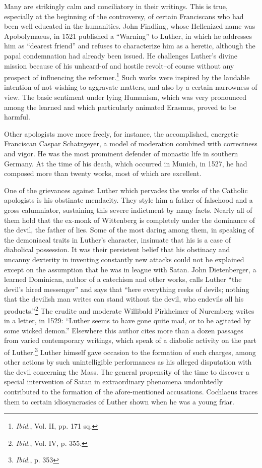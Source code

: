 Many are strikingly calm and conciliatory in their writings. This is
true, especially at the beginning of the controversy, of certain Franciscans
who had been well educated in the humanities. John Findling,
whose Hellenized name was Apobolymaeus, in 1521 published a
“Warning” to Luther, in which he addresses him as “dearest friend”
and refuses to characterize him as a heretic, although the papal condemnation
had already been issued. He challenges Luther’s divine
mission because of his unheard-of and hostile revolt--of course without
any prospect of influencing the reformer.\footnote{\textit{Ibid.}, Vol. II, pp. 171 sq.}
Such works were inspired
by the laudable intention of not wishing to aggravate matters,
and also by a certain narrowness of view. The basic sentiment under
lying Humanism, which was very pronounced among the learned and
which particularly animated Erasmus, proved to be harmful.

Other apologists move more freely, for instance, the accomplished,
energetic Franciscan Caspar Schatzgeyer, a model of moderation combined
with correctness and vigor. He was the most prominent defender
of monastic life in southern Germany. At the time of his death,
which occurred in Munich, in 1527, he had composed more than
twenty works, most of which are excellent.

One of the grievances against Luther which pervades the works of
the Catholic apologists is his obstinate mendacity. They style him a
father of falsehood and a gross calumniator, sustaining this severe
indictment by many facts. Nearly all of them hold that the ex-monk
of Wittenberg is completely under the dominance of the devil, the
father of lies. Some of the most daring among them, in speaking of
the demoniacal traits in Luther’s character, insinuate that his is a
case of diabolical possession. It was their persistent belief that his
obstinacy and uncanny dexterity in inventing constantly new attacks
could not be explained except on the assumption that he was in league
with Satan. John Dietenberger, a learned Dominican, author of a
catechism and other works, calls Luther “the devil’s hired messenger”
and says that “here everything reeks of devils; nothing that the
devilish man writes can stand without the devil, who endevils all his
products.”\footnote{\textit{Ibid.}, Vol. IV, p. 355.}
The erudite and moderate Willibald Pirkheimer of
Nuremberg writes in a letter, in 1529: “Luther seems to have gone
quite mad, or to be agitated by some wicked demon.” Elsewhere this
author cites more than a dozen passages from varied contemporary
writings, which speak of a diabolic activity on the part of Luther.\footnote{\textit{Ibid.}, p. 353}
Luther himself gave occasion to the formation of such charges, among
other actions by such unintelligible performances as his alleged disputation
with the devil concerning the Mass. The general propensity
of the time to discover a special intervention of Satan in extraordinary
phenomena undoubtedly contributed to the formation of the
afore-mentioned accusations. Cochlaeus traces them to certain idiosyncrasies
of Luther shown when he was a young friar.

